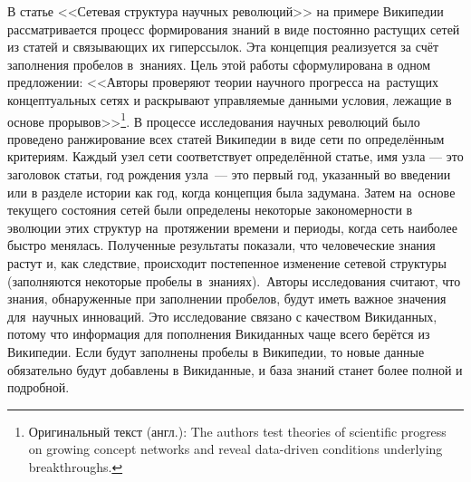 В статье <<Сетевая структура научных революций>>\autocite{NetworkStructureRevolutions} 
на примере Википедии рассматривается процесс формирования знаний 
в виде постоянно растущих сетей из статей и связывающих их гиперссылок. 
Эта концепция реализуется за счёт заполнения пробелов в~знаниях. 
Цель этой работы сформулирована в одном предложении: 
<<Авторы проверяют теории научного прогресса на~растущих концептуальных сетях 
и раскрывают управляемые данными условия, лежащие в основе прорывов>>\footnote{%
%
Оригинальный текст (англ.):  The authors test theories of scientific progress 
    on growing concept networks and reveal data-driven conditions 
    underlying breakthroughs.}. 
В процессе исследования научных революций было проведено ранжирование всех статей Википедии 
в виде сети по определённым критериям. 
Каждый узел сети соответствует определённой статье, имя узла --- это заголовок статьи, 
год рождения узла~--- это первый год, указанный во введении или в разделе истории как год, когда концепция была задумана. 
Затем на~основе текущего состояния сетей были определены некоторые закономерности 
в эволюции этих структур на~протяжении времени и периоды, 
когда сеть наиболее быстро менялась. 
Полученные результаты показали, что человеческие знания растут и, как следствие, 
происходит постепенное изменение сетевой структуры (заполняются некоторые пробелы в~знаниях).\, 
Авторы исследования считают, что знания, 
обнаруженные при заполнении пробелов, будут иметь важное значения для~научных инноваций. 
Это исследование связано с качеством Викиданных, 
потому что информация для пополнения Викиданных чаще всего берётся из Википедии. 
Если будут заполнены пробелы в Википедии, то новые данные обязательно будут добавлены в Викиданные, 
и база знаний станет более полной и подробной.
